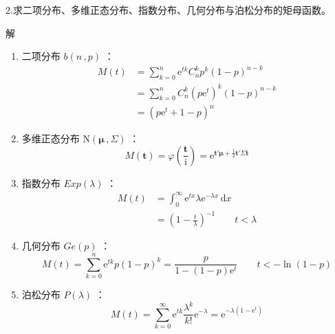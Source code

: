 \documentclass[12pt,hyperref,]{ctexart}
\begin{document}
2.求二项分布、多维正态分布、指数分布、几何分布与泊松分布的矩母函数。

\vspace{1em}

\heiti

解

\songti

\begin{enumerate}
\def\labelenumi{(\roman{enumi})}
\item
  二项分布 \(b(n\, ,p)\) ： \begin{equation*}
  \begin{aligned}
  M(t)&=\sum_{k=0}^{n}\mathrm{e}^{tk}C_n^kp^k(1-p)^{n-k} \\
  &=\sum_{k=0}^{n}C_n^k(p\mathrm{e}^{t})^k(1-p)^{n-k} \\
  &=(p\mathrm{e}^{t}+1-p)^n
  \end{aligned}
  \end{equation*}
\item
  多维正态分布 \(\mathrm{N}(\boldsymbol{\mu}\, ,\Sigma)\) ：
  \begin{equation*}
  M(\mathbf{t})=\varphi\left(\frac{\mathbf{t}}{\mathrm{i}}\right)=\mathrm{e}^{\mathbf{t}'\boldsymbol{\mu}+\frac{1}{2}\mathbf{t}'\Sigma\mathbf{t}}
  \end{equation*}
\item
  指数分布 \(Exp(\lambda)\) ： \begin{equation*}
  \begin{aligned}
  M(t)&=\int_0^{\infty}\mathrm{e}^{tx}\lambda\mathrm{e}^{-\lambda x}\, \mathrm{d}x \\
  &=\left(1-\frac{t}{\lambda}\right)^{-1} \qquad t<\lambda
  \end{aligned}
  \end{equation*}
\item
  几何分布 \(Ge(p)\) ： \begin{equation*}
  M(t)=\sum_{k=0}^{n}\mathrm{e}^{tk}p(1-p)^k=\frac{p}{1-(1-p)\mathrm{e}^t} \qquad t<-\ln (1-p)
  \end{equation*}
\item
  泊松分布 \(P(\lambda)\) ： \begin{equation*}
  M(t)=\sum_{k=0}^{\infty}\mathrm{e}^{tk}\frac{\lambda^k}{k!}\mathrm{e}^{-\lambda}=\mathrm{e}^{-\lambda\left(1-\mathrm{e}^t\right)}
  \end{equation*}
\end{enumerate}

\vspace{3em}
\end{document}
